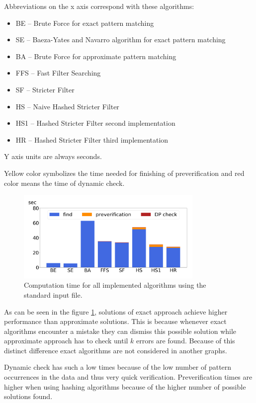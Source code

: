 Abbreviations on the x axis correspond with these algorithms:
\begin{itemize}
\item BE -- Brute Force for exact pattern matching
\item SE -- Baeza-Yates and Navarro algorithm for exact pattern matching
\item BA -- Brute Force for approximate pattern matching
\item FFS -- Fast Filter Searching
\item SF -- Stricter Filter
\item HS -- Naive Hashed Stricter Filter
\item HS1 -- Hashed Stricter Filter second implementation
\item HR -- Hashed Stricter Filter third implementation
\end{itemize}

Y axis units are always seconds.

Yellow color symbolizes the time needed for finishing of preverification and red color means the time of dynamic check.

\begin{figure}[h]
\centering
\includegraphics[width=0.8\textwidth]{img/baseAll}
\caption{Computation time for all implemented algorithms using the standard input file.}
\label{fig_compT}
\end{figure}

As can be seen in the figure \ref{fig_compT}, solutions of exact approach achieve higher performance than approximate solutions. This is because whenever exact algorithms encounter a mistake they can dismiss this possible solution while approximate approach has to check until $k$ errors are found. Because of this distinct difference exact algorithms are not considered in another graphs.

Dynamic check has such a low times because of the low number of pattern occurrences in the data and thus very quick verification. Preverification times are higher when using hashing algorithms because of the higher number of possible solutions found.

